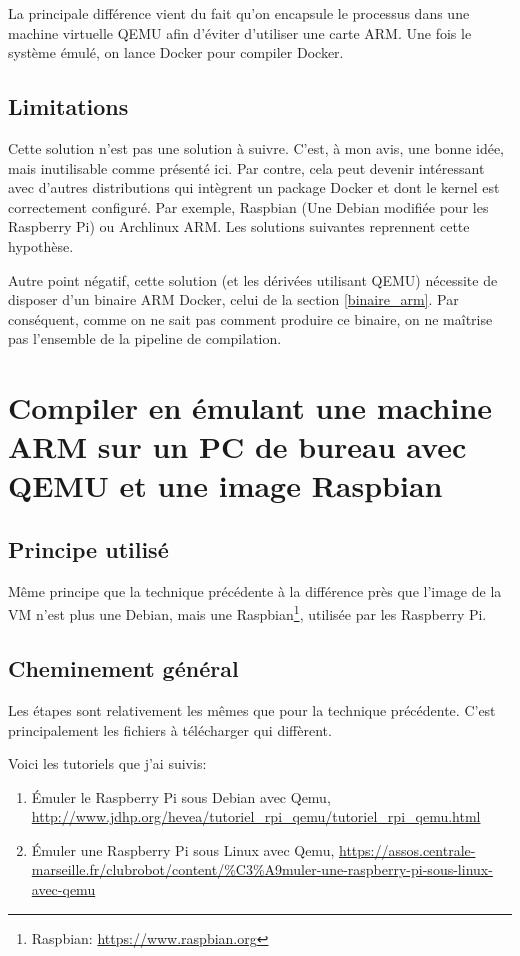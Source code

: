 \documentclass[11pt,a4paper,oneside]{report}
\begin{document}
La principale différence vient du fait qu'on encapsule le processus dans une machine virtuelle QEMU afin d'éviter d'utiliser une carte ARM. Une fois le système émulé, on lance Docker pour compiler Docker.

\subsection{Limitations}

Cette solution n'est pas une solution à suivre. C'est, à mon avis, une bonne idée, mais inutilisable comme présenté ici. Par contre, cela peut devenir intéressant avec d'autres distributions qui intègrent un package Docker et dont le kernel est correctement configuré. Par exemple, Raspbian (Une Debian modifiée pour les Raspberry Pi) ou Archlinux ARM. Les solutions suivantes reprennent cette hypothèse\label{hypothese_debian}.


Autre point négatif, cette solution (et les dérivées utilisant QEMU) nécessite de disposer d'un binaire ARM Docker, celui de la section \ref{binaire_arm}. Par conséquent, comme on ne sait pas comment produire ce binaire, on ne maîtrise pas l'ensemble de la pipeline de compilation.


\section{Compiler en émulant une machine ARM sur un PC de bureau avec QEMU et une image Raspbian}

\subsection{Principe utilisé}

Même principe que la technique précédente à la différence près que l'image de la VM n'est plus une Debian, mais une Raspbian\footnote{Raspbian: \url{https://www.raspbian.org}}, utilisée par les Raspberry Pi.

\subsection{Cheminement général}

Les étapes sont relativement les mêmes que pour la technique précédente. C'est principalement les fichiers à télécharger qui diffèrent.

Voici les tutoriels que j'ai suivis:

\begin{enumerate}
\item Émuler le Raspberry Pi sous Debian avec Qemu, \url{http://www.jdhp.org/hevea/tutoriel_rpi_qemu/tutoriel_rpi_qemu.html}
\item Émuler une Raspberry Pi sous Linux avec Qemu, \url{https://assos.centrale-marseille.fr/clubrobot/content/%C3%A9muler-une-raspberry-pi-sous-linux-avec-qemu}
\end{enumerate}
\end{document}
